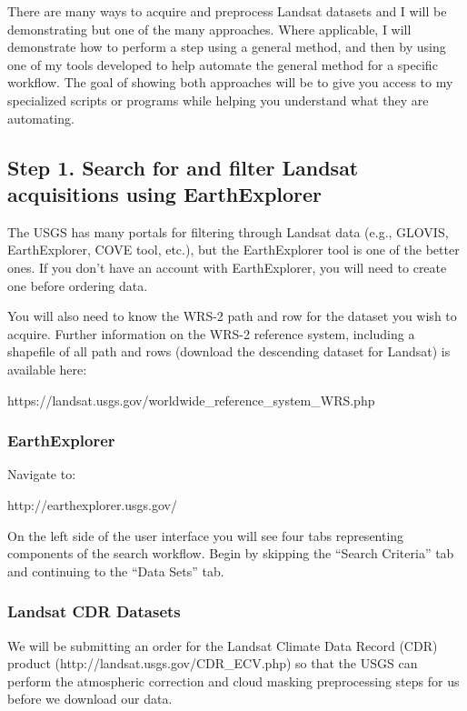 \documentclass{article}
\begin{document}
There are many ways to acquire and preprocess Landsat datasets and I
will be demonstrating but one of the many approaches. Where applicable,
I will demonstrate how to perform a step using a general method, and
then by using one of my tools developed to help automate the general
method for a specific workflow. The goal of showing both approaches will
be to give you access to my specialized scripts or programs while
helping you understand what they are automating.

    \subsection{Step 1. Search for and filter Landsat acquisitions using
EarthExplorer}

The USGS has many portals for filtering through Landsat data (e.g.,
GLOVIS, EarthExplorer, COVE tool, etc.), but the EarthExplorer tool is
one of the better ones. If you don't have an account with EarthExplorer,
you will need to create one before ordering data.

You will also need to know the WRS-2 path and row for the dataset you
wish to acquire. Further information on the WRS-2 reference system,
including a shapefile of all path and rows (download the descending
dataset for Landsat) is available here:

https://landsat.usgs.gov/worldwide\_reference\_system\_WRS.php

\subsubsection{EarthExplorer}

Navigate to:

http://earthexplorer.usgs.gov/

On the left side of the user interface you will see four tabs
representing components of the search workflow. Begin by skipping the
``Search Criteria'' tab and continuing to the ``Data Sets'' tab.

\subsubsection{Landsat CDR Datasets}

We will be submitting an order for the Landsat Climate Data Record (CDR)
product (http://landsat.usgs.gov/CDR\_ECV.php) so that the USGS can
perform the atmospheric correction and cloud masking preprocessing steps
for us before we download our data.
\end{document}
